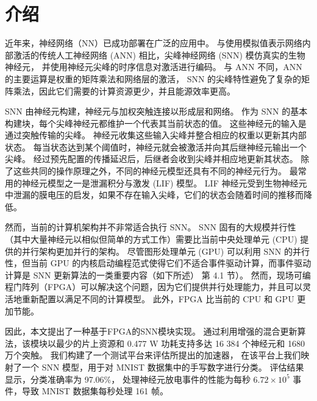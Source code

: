 

\chapter{介绍}

近年来，神经网络（NN）已成功部署在广泛的应用中。 
与使用模拟值表示网络内部激活的传统人工神经网络 (ANN) 相比，尖峰神经网络 (SNN) 模仿真实的生物神经元，
并使用神经元尖峰的时序信息对激活进行编码。 与 ANN 不同，ANN 的主要运算是权重的矩阵乘法和网络层的激活，
SNN 的尖峰特性避免了复杂的矩阵乘法，因此它们需要的计算资源更少，并且能源效率更高。

SNN 由神经元构建，神经元与加权突触连接以形成层和网络。 
作为 SNN 的基本构建块，每个尖峰神经元都维护一个代表其当前状态的值。 
这些神经元的输入是通过突触传输的尖峰。 神经元收集这些输入尖峰并整合相应的权重以更新其内部状态。 
每当状态达到某个阈值时，神经元就会被激活并向其后继神经元输出一个尖峰。 
经过预先配置的传播延迟后，后继者会收到尖峰并相应地更新其状态。 除了这些共同的操作原理之外，不同的神经元模型还具有不同的神经元行为。 最常用的神经元模型之一是泄漏积分与激发 (LIF) 模型。 LIF 神经元受到生物神经元中泄漏的膜电压的启发，如果不存在输入尖峰，它们的状态会随着时间的推移而降低。

然而，当前的计算机架构并不非常适合执行 SNN。 
SNN 固有的大规模并行性（其中大量神经元以相似但简单的方式工作）需要比当前中央处理单元 (CPU) 提供的并行架构更加并行的架构。 尽管图形处理单元 (GPU) 可以利用 SNN 的并行性，但当前 GPU 的内核启动编程范式使得它们不适合事件驱动计算，而事件驱动计算是 SNN 更新算法的一类重要内容（如下所述） 第 4.1 节）。 然而，现场可编程门阵列（FPGA）可以解决这个问题，因为它们提供并行处理能力，并且可以灵活地重新配置以满足不同的计算模型。 此外，FPGA 比当前的 CPU 和 GPU 更加节能。

因此，本文提出了一种基于FPGA的SNN模块实现。 
通过利用增强的混合更新算法，该模块以最少的片上资源和 0.477 W 功耗支持多达 16 384 个神经元和 1680 万个突触。
我们构建了一个测试平台来评估所提出的加速器，
在该平台上我们映射了一个 SNN 模型，用于对 MNIST 数据集中的手写数字进行分类。 
评估结果显示，分类准确率为 97.06\%，
处理神经元放电事件的性能为每秒 $6.72 \times 10^5$ 事件，导致 MNIST 数据集每秒处理 161 帧。

